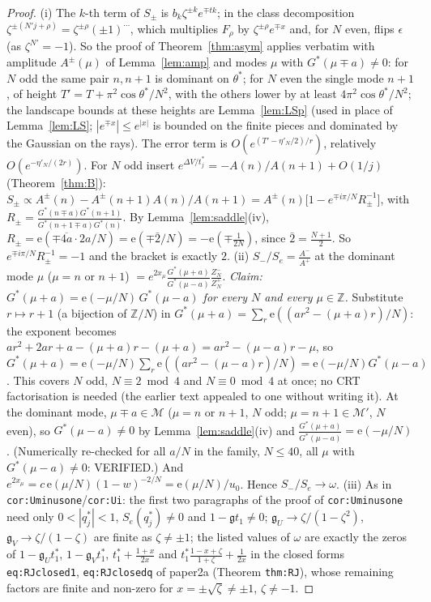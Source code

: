 \documentclass[11pt]{article}
\theoremstyle{definition}\newtheorem{definition}[theorem]{Definition}
\theoremstyle{remark}\newtheorem{remark}[theorem]{Remark}
\newcommand{\e}{\mathrm{e}}
\begin{document}
\begin{proof}
(i) The $k$-th term of $S_\pm$ is $b_k\zeta^{\pm k}e^{\mp tk}$; in the class decomposition $\zeta^{\pm(N'j+\rho)}=\zeta^{\pm\rho}(\pm1)^{\cdots}$, which multiplies $F_\rho$ by $\zeta^{\pm\rho}e^{\mp x}$ and, for $N$ even, flips $\epsilon$ (as $\zeta^{N'}=-1$). So the proof of Theorem~\ref{thm:asym} applies verbatim with amplitude $A^\pm(\mu)$ of Lemma~\ref{lem:amp} and modes $\mu$ with $G^*(\mu\mp a)\ne0$: for $N$ odd the same pair $n,n+1$ is dominant on $\theta^*$; for $N$ even the single mode $n+1$, of height $T'=T+\pi^2\cos\theta^*/N^2$, with the others lower by at least $4\pi^2\cos\theta^*/N^2$; the landscape bounds at these heights are Lemma~\ref{lem:LSp} (used in place of Lemma~\ref{lem:LS}; $|e^{\mp x}|\le e^{|x|}$ is bounded on the finite pieces and dominated by the Gaussian on the rays). The error term is $O(e^{(T'-\eta'_N/2)/r})$, relatively $O(e^{-\eta'_N/(2r)})$. For $N$ odd insert $e^{\Delta V/t^*_j}=-A(n)/A(n+1)+O(1/j)$ (Theorem~\ref{thm:B}):
$S_\pm\propto A^\pm(n)-A^\pm(n+1)A(n)/A(n+1)=A^\pm(n)\big[1-e^{\mp i\pi/N}R_\pm^{-1}\big]$, with $R_\pm=\frac{G^*(n\mp a)G^*(n+1)}{G^*(n+1\mp a)G^*(n)}$. By Lemma~\ref{lem:saddle}(iv), $R_\pm=\e(\mp\overline{4a}\cdot2a/N)=\e(\mp\bar2/N)=-\e(\mp\frac1{2N})$, since $\bar2=\frac{N+1}2$. So $e^{\mp i\pi/N}R_\pm^{-1}=-1$ and the bracket is exactly $2$.
(ii) $S_-/S_e=\frac{A^-}{A^+}$ at the dominant mode $\mu$ ($\mu=n$ or $n+1$) $=e^{2x_\mu}\frac{G^*(\mu+a)}{G^*(\mu-a)}\frac{Z^-_N}{Z^+_N}$. \emph{Claim: $G^*(\mu+a)=\e(-\mu/N)\,G^*(\mu-a)$ for every $N$ and every $\mu\in\mathbb Z$.} Substitute $r\mapsto r+1$ (a bijection of $\mathbb Z/N$) in $G^*(\mu+a)=\sum_r\e((ar^2-(\mu+a)r)/N)$: the exponent becomes $a r^2+2ar+a-(\mu+a)r-(\mu+a)=ar^2-(\mu-a)r-\mu$, so $G^*(\mu+a)=\e(-\mu/N)\sum_r\e((ar^2-(\mu-a)r)/N)=\e(-\mu/N)G^*(\mu-a)$. This covers $N$ odd, $N\equiv2\bmod4$ and $N\equiv0\bmod4$ at once; no CRT factorisation is needed (the earlier text appealed to one without writing it). At the dominant mode, $\mu\mp a\in\mathcal M$ ($\mu=n$ or $n+1$, $N$ odd; $\mu=n+1\in\mathcal M'$, $N$ even), so $G^*(\mu-a)\ne0$ by Lemma~\ref{lem:saddle}(iv) and $\frac{G^*(\mu+a)}{G^*(\mu-a)}=\e(-\mu/N)$. (Numerically re-checked for all $a/N$ in the family, $N\le40$, all $\mu$ with $G^*(\mu-a)\ne0$: VERIFIED.) And $e^{2x_\mu}=c\,\e(\mu/N)(1-w)^{-2/N}=\e(\mu/N)/u_0$. Hence $S_-/S_e\to\omega$.
(iii) As in \texttt{cor:Uminusone}/\texttt{cor:Ui}: the first two paragraphs of the proof of \texttt{cor:Uminusone} need only $0<|q^*_j|<1$, $S_e(q^*_j)\ne0$ and $1-\mathfrak g t_1\ne0$; $\mathfrak g_U\to\zeta/(1-\zeta^2)$, $\mathfrak g_V\to\zeta/(1-\zeta)$ are finite as $\zeta\ne\pm1$; the listed values of $\omega$ are exactly the zeros of $1-\mathfrak g_Ut_1^*$, $1-\mathfrak g_Vt_1^*$, $t_1^*+\frac{1+x}{2x}$ and $t_1^*\frac{1-x+\zeta}{1+\zeta}+\frac1{2x}$ in the closed forms \texttt{eq:RJclosed1}, \texttt{eq:RJclosedq} of paper2a (Theorem \texttt{thm:RJ}), whose remaining factors are finite and non-zero for $x=\pm\sqrt\zeta\ne\pm1$, $\zeta\ne-1$.
\end{proof}
\end{document}
